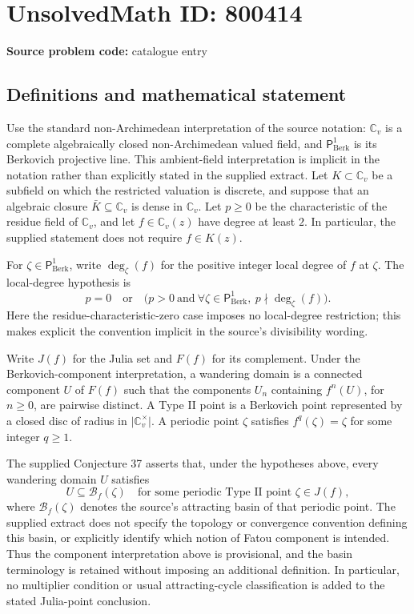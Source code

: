 \documentclass[11pt]{article}
\begin{document}
\section*{UnsolvedMath ID: 800414}
\textbf{Source problem code:} catalogue entry
\subsection{Definitions and mathematical statement}
Use the standard non-Archimedean interpretation of the source notation: \(\mathbb C_v\) is a complete algebraically closed non-Archimedean valued field, and \(\mathsf P^1_{\mathrm{Berk}}\) is its Berkovich projective line. This ambient-field interpretation is implicit in the notation rather than explicitly stated in the supplied extract. Let \(K\subset\mathbb C_v\) be a subfield on which the restricted valuation is discrete, and suppose that an algebraic closure \(\bar K\subseteq\mathbb C_v\) is dense in \(\mathbb C_v\). Let \(p\geq 0\) be the characteristic of the residue field of \(\mathbb C_v\), and let \(f\in\mathbb C_v(z)\) have degree at least \(2\). In particular, the supplied statement does not require \(f\in K(z)\).

For \(\zeta\in\mathsf P^1_{\mathrm{Berk}}\), write \(\deg_\zeta(f)\) for the positive integer local degree of \(f\) at \(\zeta\). The local-degree hypothesis is
\[
 p=0\quad\text{or}\quad
 \bigl(p>0\ \text{and}\ \forall\zeta\in\mathsf P^1_{\mathrm{Berk}},\ p\nmid\deg_\zeta(f)\bigr).
\]
Here the residue-characteristic-zero case imposes no local-degree restriction; this makes explicit the convention implicit in the source's divisibility wording.

Write \(J(f)\) for the Julia set and \(F(f)\) for its complement. Under the Berkovich-component interpretation, a wandering domain is a connected component \(U\) of \(F(f)\) such that the components \(U_n\) containing \(f^n(U)\), for \(n\geq0\), are pairwise distinct. A Type II point is a Berkovich point represented by a closed disc of radius in \(\lvert\mathbb C_v^\times\rvert\). A periodic point \(\zeta\) satisfies \(f^q(\zeta)=\zeta\) for some integer \(q\geq1\).

The supplied Conjecture 37 asserts that, under the hypotheses above, every wandering domain \(U\) satisfies
\[
 U\subseteq\mathcal B_f(\zeta)
 \quad\text{for some periodic Type II point }\zeta\in J(f),
\]
where \(\mathcal B_f(\zeta)\) denotes the source's attracting basin of that periodic point. The supplied extract does not specify the topology or convergence convention defining this basin, or explicitly identify which notion of Fatou component is intended. Thus the component interpretation above is provisional, and the basin terminology is retained without imposing an additional definition. In particular, no multiplier condition or usual attracting-cycle classification is added to the stated Julia-point conclusion.
\end{document}
